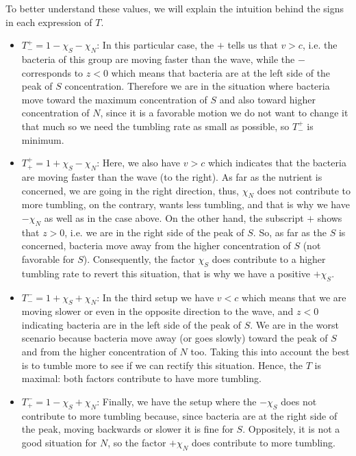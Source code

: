\documentclass[11pt,twoside]{article}
\numberwithin{equation}{section}
\theoremstyle{plain}
\theoremstyle{nonumberplain}
\begin{document}
To better understand these values, we will explain the intuition behind the signs in each expression of $T$.

\begin{itemize}
    \item $T^+_- = 1-\chi_S-\chi_N$: In this particular case, the $+$ tells us that $v>c$, i.e. the bacteria of this group are moving faster than the wave, while the $-$ corresponds to $z<0$ which means that bacteria are at the left side of the peak of $S$ concentration. Therefore we are in the situation where bacteria move toward the maximum concentration of $S$ and also toward higher concentration of $N$, since it is a favorable motion we do not want to change it that much so we need the tumbling rate as small as possible, so $T^+_-$ is minimum.
    \item $T^+_+ = 1+\chi_S-\chi_N$: Here, we also have $v>c$ which indicates that the bacteria are moving faster than the wave (to the right). As far as the nutrient is concerned, we are going in the right direction, thus, $\chi_N$ does not contribute to more tumbling, on the contrary, wants less tumbling, and that is why we have $-\chi_N$ as well as in the case above. On the other hand, the subscript $+$ shows that $z>0$, i.e. we are in the right side of the peak of $S$. So, as far as the $S$ is concerned, bacteria move away from the higher concentration of $S$ (not favorable for $S$). Consequently, the factor $\chi_S$ does contribute to a higher tumbling rate to revert this situation, that is why we have a positive $+\chi_S$.

    \item $T^-_- = 1+\chi_S+\chi_N$: In the third setup we have $v<c$ which means that we are moving slower or even in the opposite direction to the wave, and $z<0$ indicating bacteria are in the left side of the peak of $S$. We are in the worst scenario because bacteria move away (or goes slowly) toward the peak of $S$ and from the higher concentration of $N$ too. Taking this into account the best is to tumble more to see if we can rectify this situation. Hence, the $T$ is maximal: both factors contribute to have more tumbling.

    \item $T^-_+ = 1-\chi_S+\chi_N$: Finally, we have the setup where the $-\chi_S$ does not contribute to more tumbling because, since bacteria are at the right side of the peak, moving backwards or slower it is fine for $S$. Oppositely, it is not a good situation for $N$, so the factor $+\chi_N$ does contribute to more tumbling.
\end{itemize}
\fi
\end{document}
